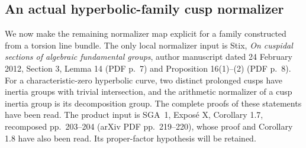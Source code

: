 \subsection{An actual hyperbolic-family cusp normalizer}
\label{ag:c149-normalizer}

We now make the remaining normalizer map explicit for a family
constructed from a torsion line bundle. The only local normalizer
input is Stix, \emph{On cuspidal sections of algebraic fundamental
groups}, author manuscript dated 24 February 2012, Section 3,
Lemma 14 (PDF p.~7) and Proposition 16(1)--(2) (PDF p.~8).
For a characteristic-zero hyperbolic curve, two distinct prolonged
cusps have inertia groups with trivial intersection, and the
arithmetic normalizer of a cusp inertia group is its decomposition
group. The complete proofs of these statements have been read.
The product input is SGA~1, Expos\'e X, Corollary 1.7, recomposed
pp.~203--204 (arXiv PDF pp.~219--220), whose proof and Corollary 1.8
have also been read. Its proper-factor hypothesis will be retained.

